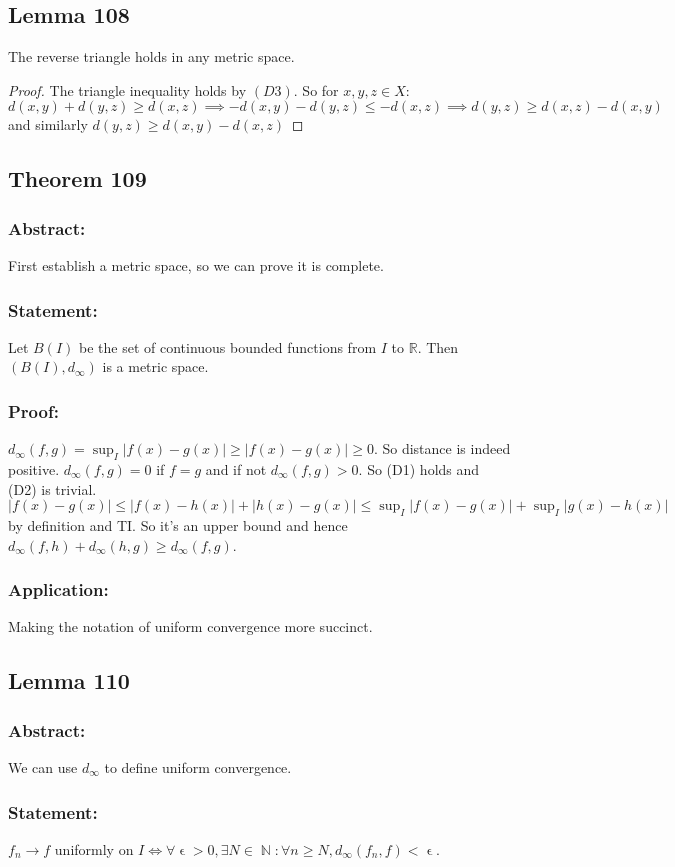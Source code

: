 \documentclass{article}
\DeclareMathOperator\eps{\epsilon}
\DeclareMathOperator\N{\mathbb{N}}
\begin{document}
\subsection{Lemma 108}
The reverse triangle holds in any metric space. \begin{proof}
The triangle inequality holds by $(D3)$. So for $x,y,z \in X$: $$
d(x,y) + d(y,z) \geq d(x,z) \implies -d(x,y)-d(y,z) \leq -d(x,z) \implies d(y,z) \geq d(x,z) - d(x,y)
$$
and similarly $d(y,z) \geq d(x,y) - d(x,z)$
\end{proof}
\subsection{Theorem 109}
\subsubsection*{Abstract:}
First establish a metric space, so we can prove it is complete.
\subsubsection*{Statement:}
Let $B(I)$ be the set of continuous bounded functions from $I$ to $\mathbb{R}$. Then
$(B(I), d_\infty)$ is a metric space.
\subsubsection*{Proof:}
$d_{\infty}(f,g) = \sup_{I}|f(x)-g(x)| \geq |f(x)-g(x)| \geq 0$. So distance is indeed positive.
$d_{\infty}(f,g) = 0$ if $f=g$ and if not $d_{\infty}(f,g)>0$. So (D1) holds and (D2)
is trivial. $|f(x)-g(x)| \leq |f(x)-h(x)|+|h(x)-g(x)| \leq \sup_I|f(x)-g(x)| + \sup_I|g(x)-h(x)|$ by definition and TI.
So it's an upper bound and hence $d_{\infty}(f,h)+d_{\infty}(h,g) \geq d_{\infty}(f,g)$.
\subsubsection*{Application:}
Making the notation of uniform convergence more succinct.
\subsection{Lemma 110}
\subsubsection*{Abstract:}
We can use $d_{\infty}$ to define uniform convergence.
\subsubsection*{Statement:}
$f_n \to f$ uniformly on $I \iff \forall \eps>0, \exists N \in \N: \forall n \geq N, d_{\infty}(f_n,f)< \eps$.
\end{document}
